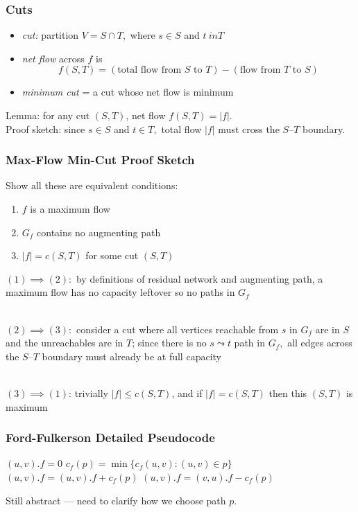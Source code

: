 \documentclass{beamer}
\newcommand{\stanza}{ \\~\ }
\begin{document}
\begin{frame} \frametitle{Cuts}
\begin{itemize}
  \item \emph{cut:} partition $V=S \cap T,$ where $s \in S$ and $t \ in T$
  \item \emph{net flow} across $f$ is
    \[ f(S, T) = (\text{total flow from } S \text{ to } T) -
                  (\text{flow from } T \text{ to } S) \]
  \item \emph{minimum cut} = a cut whose net flow is minimum
\end{itemize}
\vspace{.5cm}

Lemma: for any cut $(S, T)$, net flow $f(S,T) = |f|.$ \\
Proof sketch: since $s \in S$ and $t \in T,$ total flow $|f|$ must cross the
$S$--$T$ boundary.
\end{frame}

\begin{frame} \frametitle{Max-Flow Min-Cut Proof Sketch}
Show all these are equivalent conditions:
\begin{enumerate}
  \item $f$ is a maximum flow
  \item $G_f$ contains no augmenting path
  \item $|f| = c(S, T)$ for some cut $(S, T)$
\end{enumerate}

$(1) \implies (2):$ by definitions of residual network and augmenting path,
a maximum flow has no capacity leftover so no paths in $G_f$ \stanza

$(2) \implies (3):$ consider a cut where all vertices reachable from $s$ in $G_f$
are in $S$ and the unreachables are in $T$; since there is no $s \leadsto t$
path in $G_f,$ all edges across the $S$--$T$ boundary must already be at full capacity
\stanza

$(3) \implies (1)$: trivially $|f| \leq c(S, T)$, and if $|f|=c(S, T)$ then this
$(S, T)$ is maximum
\end{frame}

\begin{frame} \frametitle{Ford-Fulkerson Detailed Pseudocode}
{\footnotesize
\begin{algorithmic}[1]
    \State $(u, v).f = 0$
  \EndFor
    \State $c_f(p) = \min\{c_f(u, v) : (u, v) \in p\}$
        \State $(u, v).f = (u, v).f + c_f(p)$
      \Else
        \State $(u, v).f = (v, u).f - c_f(p)$
      \EndIf
    \EndFor
  \EndWhile
  \State {}
  \EndFunction
\end{algorithmic}
}
Still abstract --- need to clarify how we choose path $p.$
\end{frame}
\end{document}

